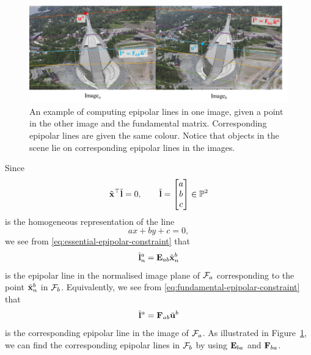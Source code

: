 \begin{figure}[htb]
    \centering
    \includegraphics[width=\columnwidth]{figures/epipolar-lines-example.png}
    \caption{An example of computing epipolar lines in one image, given a point in the other image and the fundamental matrix.
    Corresponding epipolar lines are given the same colour.
    Notice that objects in the scene lie on corresponding epipolar lines in the images.
    }
    \label{fig:epipolar-lines-example}
\end{figure}
Since
\begin{equation}
  \tilde{{\boldsymbol{\mathbf{x}}}}^{\top} \tilde{{\boldsymbol{\mathbf{l}}}} = 0, \qquad \tilde{{\boldsymbol{\mathbf{l}}}} =
  \begin{bmatrix}
    a\\
    b\\
    c
  \end{bmatrix}
  \in {\mathbb P}^2
\end{equation}
is the homogeneous representation of the line
\begin{equation}
  ax + by + c = 0,
\end{equation}
we see from \eqref{eq:essential-epipolar-constraint} that
\begin{equation}
  \tilde{{\boldsymbol{\mathbf{l}}}}^a_n = {\boldsymbol{\mathbf{E}}}_{ab} \tilde{{\boldsymbol{\mathbf{x}}}}^b_n
\end{equation}
is the epipolar line in the normalised image plane of $\mathcal{F}_a$ corresponding to the point $\tilde{{\boldsymbol{\mathbf{x}}}}^b_n$ in $\mathcal{F}_b$.
Equivalently, we see from \eqref{eq:fundamental-epipolar-constraint} that
\begin{equation}
  \tilde{{\boldsymbol{\mathbf{l}}}}^a = {\boldsymbol{\mathbf{F}}}_{ab} \tilde{{\boldsymbol{\mathbf{u}}}}^b
\end{equation}
is the corresponding epipolar line in the image of $\mathcal{F}_a$.
As illustrated in Figure~\ref{fig:epipolar-lines-example}, we can find the corresponding epipolar lines in $\mathcal{F}_b$ by using ${\boldsymbol{\mathbf{E}}}_{ba}$ and ${\boldsymbol{\mathbf{F}}}_{ba}$.

